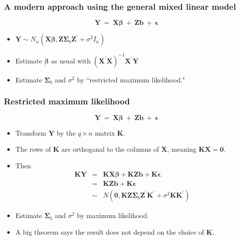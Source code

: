 \documentclass[serif]{beamer} %
\begin{document}
\begin{frame}
\frametitle{A modern approach using the general mixed linear model}
\begin{displaymath}
    \mathbf{Y}~=~\mathbf{X} \boldsymbol{\beta} ~+~ \mathbf{Zb} ~+~\boldsymbol{\epsilon}
\end{displaymath}
  \begin{itemize}
    \item $\mathbf{Y} \sim N_n(\mathbf{X}\boldsymbol{\beta}, \mathbf{Z} \boldsymbol{\Sigma}_b \mathbf{Z}^\prime + \sigma^2 I_n)$
    \item Estimate $\boldsymbol{\beta}$ as usual with $(\mathbf{X}^\prime \mathbf{X})^{-1} 
                   \mathbf{X}^\prime \mathbf{Y}$
    \item Estimate $\boldsymbol{\Sigma}_b$ and $\sigma^2$ by ``restricted maximum likelihood."
  \end{itemize}
\end{frame}

\begin{frame}
\frametitle{Restricted maximum likelihood}
\begin{displaymath}
    \mathbf{Y}~=~\mathbf{X} \boldsymbol{\beta} ~+~ \mathbf{Zb} ~+~\boldsymbol{\epsilon}
\end{displaymath}

  \begin{itemize}
    \item Transform $\mathbf{Y}$ by the $q \times n$ matrix $\mathbf{K}$.
    \item The rows of $\mathbf{K}$ are orthoganal to the columns of $\mathbf{X}$, meaning $\mathbf{KX} = \mathbf{0}$.
    \item Then 
\begin{eqnarray*}
    \mathbf{KY} & = & \mathbf{KX} \boldsymbol{\beta} + \mathbf{KZb} + \mathbf{K}\boldsymbol{\epsilon} \\
     & = & \mathbf{KZb} + \mathbf{K}\boldsymbol{\epsilon} \\
     & \sim & N(\mathbf{0}, \mathbf{KZ}\boldsymbol{\Sigma}_b\mathbf{Z^\prime K^\prime} + \sigma^2 \mathbf{KK}^\prime)
\end{eqnarray*}
    \item Estimate $\boldsymbol{\Sigma}_b$ and $\sigma^2$ by maximum likelihood.
    \item A big theorem says the result does not depend on the choice of $\mathbf{K}$.
  \end{itemize}
\end{frame}
\end{document}
